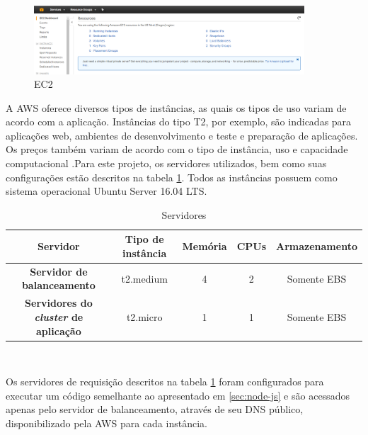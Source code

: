 \begin{figure}[htb]
	\caption{\label{fig:ec2con}EC2}
	\begin{center}
		\includegraphics[width=0.90\textwidth]{img/ec2dash.png}
	\end{center}
\end{figure}

A AWS oferece diversos tipos de instâncias, as quais os tipos de uso variam de acordo com a aplicação. Instâncias do tipo T2, por exemplo, são indicadas para aplicações web, ambientes de desenvolvimento e teste e preparação de aplicações. Os preços também variam de acordo com o tipo de instância, uso e capacidade computacional \cite{amazon-cloud-instances}.Para este projeto, os servidores utilizados, bem como suas configurações estão descritos na tabela \ref{tab:servidores}. Todos as instâncias possuem como sistema operacional Ubuntu Server 16.04 LTS. 

	\begin{table}[h]
		\caption{Servidores}
		\centering
		\small
		\renewcommand{\arraystretch}{1.2} %
		\begin{tabular}{c|c|c|c|c}
			\hline 
			\textbf{Servidor} & Tipo de instância & Memória & CPUs & Armazenamento \\ 
			\hline 
			\textbf{Servidor de balanceamento} & t2.medium & 4 & 2 & Somente EBS \\ 
			\hline 
			\textbf{Servidores do \textit{cluster} de aplicação} & t2.micro & 1 & 1 & Somente EBS \\ 
			\hline 
		\end{tabular}\\		
		\vspace{3mm}
		\label{tab:servidores}
	\end{table}
	
Os servidores de requisição descritos na tabela \ref{tab:servidores} foram configurados para executar um código semelhante ao apresentado em \ref{sec:node-js} e são acessados apenas pelo servidor de balanceamento, através de seu DNS público, disponibilizado pela AWS para cada instância.  

